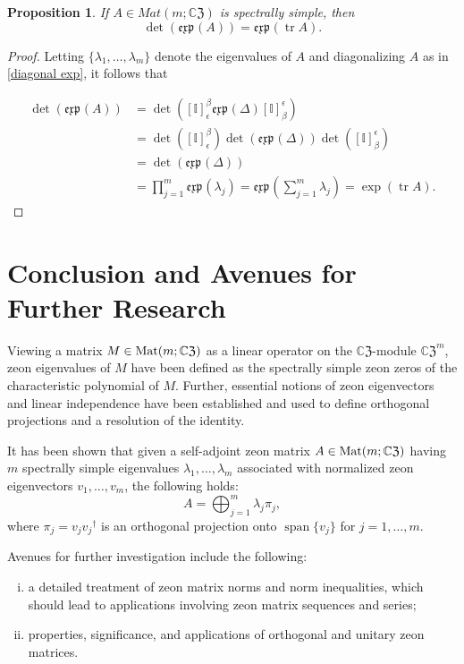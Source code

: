 \documentclass{article}
\newtheorem{proposition}[theorem]{Proposition}
\theoremstyle{definition}
\newcommand{\zexp}{\mathfrak{exp}\mspace{1mu}}
\newcommand{\CZ}{\mathbb{C}\mathfrak{Z}}
\newcommand{\Mat}{{\rm Mat}}
\DeclareMathOperator{\tr}{tr}
\DeclareMathOperator{\spn}{span}
\newcommand{\mI}{\mathbb{I}}
\numberwithin{equation}{section}
\begin{document}
\begin{proposition}
If $A\in Mat(m;\CZ)$ is spectrally simple, then  \begin{equation}
\det(\zexp(A))=\zexp(\tr A).
\end{equation}
\end{proposition}

\begin{proof}
Letting $\{\lambda_1, \ldots, \lambda_m\}$ denote the eigenvalues of $A$ and diagonalizing $A$ as in \eqref{diagonal exp}, it follows that 

\begin{align*}
\det(\zexp(A))&=\det\left([\mI]_\epsilon^\beta \zexp(\Delta) [\mI]_\beta^\epsilon\right)\\
&=\det\left([\mI]_\epsilon^\beta\right)\det\left(\zexp(\Delta)\right)\det\left( [\mI]_\beta^\epsilon\right)\\
&=\det\left(\zexp(\Delta)\right)\\
&=\prod_{j=1}^m \zexp(\lambda_j)=\zexp\left(\sum_{j=1}^m\lambda_j\right)=\exp(\tr A).
\end{align*}
\end{proof}



\section{Conclusion and Avenues for Further Research}\label{conclusion}


Viewing a matrix $M\in\Mat(m;{\CZ})$ as a linear operator on the $\CZ$-module ${\CZ}^m$, zeon eigenvalues of $M$ have been defined as the spectrally simple zeon zeros of the characteristic polynomial of $M$.  Further, essential notions of zeon eigenvectors and linear independence have been established and used to define orthogonal projections and a resolution of the identity.
 
It has been shown that given a self-adjoint zeon matrix $A\in\Mat(m;\CZ)$  having $m$ spectrally simple eigenvalues $\lambda_1, \ldots, \lambda_m$  associated with normalized zeon eigenvectors $v_1, \ldots, v_m$, the following holds: \begin{equation*}
A=\bigoplus_{j=1}^m \lambda_j\pi_j,
\end{equation*}
where $\pi_j=v_j{v_j}^\dag$ is an orthogonal projection onto $\spn\{v_j\}$ for $j=1,\ldots, m$.

Avenues for further investigation include the following: 
\begin{enumerate}[i.]
\item a detailed treatment of zeon matrix norms and norm inequalities, which should lead to applications involving zeon matrix sequences and series;
\item properties, significance, and applications of orthogonal and unitary zeon matrices.
\end{enumerate}
\end{document}
